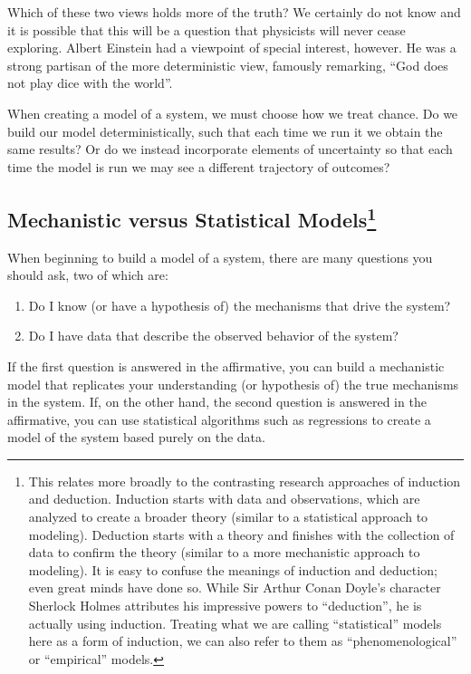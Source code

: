 \documentclass[]{memoir}
\begin{document}
Which of these two views holds more of the truth? We certainly do not
know and it is possible that this will be a question that physicists
will never cease exploring. Albert Einstein had a viewpoint of special
interest, however. He was a strong partisan of the more deterministic
view, famously remarking, ``God does not play dice with the world''.

When creating a model of a system, we must choose how we treat chance.
Do we build our model deterministically, such that each time we run it
we obtain the same results? Or do we instead incorporate elements of
uncertainty so that each time the model is run we may see a different
trajectory of outcomes?

\subsection[Mechanistic versus Statistical Models]{Mechanistic versus
Statistical Models\footnote{This relates more broadly to the contrasting
  research approaches of induction and deduction. Induction starts with
  data and observations, which are analyzed to create a broader theory
  (similar to a statistical approach to modeling). Deduction starts with
  a theory and finishes with the collection of data to confirm the
  theory (similar to a more mechanistic approach to modeling). It is
  easy to confuse the meanings of induction and deduction; even great
  minds have done so. While Sir Arthur Conan Doyle's character Sherlock
  Holmes attributes his impressive powers to ``deduction'', he is
  actually using induction. Treating what we are calling ``statistical''
  models here as a form of induction, we can also refer to them as
  ``phenomenological'' or ``empirical'' models.}}

When beginning to build a model of a system, there are many questions
you should ask, two of which are:

\begin{enumerate}
\def\labelenumi{\arabic{enumi}.}
\itemsep1pt\parskip0pt
\item
  Do I know (or have a hypothesis of) the mechanisms that drive the
  system?
\item
  Do I have data that describe the observed behavior of the system?
\end{enumerate}

If the first question is answered in the affirmative, you can build a
mechanistic model that replicates your understanding (or hypothesis of)
the true mechanisms in the system. If, on the other hand, the second
question is answered in the affirmative, you can use statistical
algorithms such as regressions to create a model of the system based
purely on the data.
\end{document}
